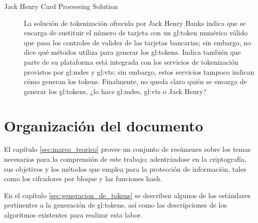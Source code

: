 
\begin{description}
  \item[Jack Henry Card Processing Solution]
    La solución de tokenización ofrecida por Jack Henry Banks indica que se
    encarga de sustituir el número de tarjeta con un \gls{gl:token} numérico
    válido que pasa los controles de validez  de las tarjetas bancarias; sin
    embargo, no dice qué métodos utiliza para generar los \glspl{gl:token}.
    Indica también que parte de su plataforma está integrada con los servicios
    de tokenización provistos por \gls{gl:mdes} y \gls{gl:vts}; sin embargo,
    estos servicios tampoco indican cómo generan los tokens. Finalmente, no
    queda claro quién se encarga de generar los \glspl{gl:token}, ¿lo hace
    \gls{gl:mdes}, \gls{gl:vts} o Jack Henry?
\end{description}




\section{Organización del documento}

El capítulo \ref{sec:marco_teorico} provee un conjunto de resúmenes sobre los
temas necesarios para la comprensión de este trabajo; adentrándose en la
criptografía, sus objetivos y los métodos que emplea para la protección de
información, tales como los cifradores por bloque y las funciones hash.

En el capítulo \ref{sec:generacion_de_tokens} se describen algunos de los
estándares pertinentes a la generación de \glspl{gl:token}, así como las
descripciones de los algoritmos existentes para realizar esta labor.

